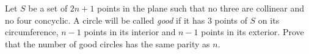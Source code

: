 Let $S$ be a set of $2n+1$ points in the plane such that no three are collinear and no four concyclic. A circle will be called \emph{good} if it has 3 points of $S$ on its circumference, $n-1$ points in its interior and $n-1$ points in its exterior. Prove that the number of good circles has the same parity as $n$.